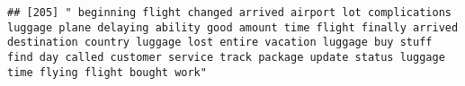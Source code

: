 \documentclass[
]{article}
\begin{document}
\begin{verbatim}
## [205] " beginning flight changed arrived airport lot complications luggage plane delaying ability good amount time flight finally arrived destination country luggage lost entire vacation luggage buy stuff find day called customer service track package update status luggage time flying flight bought work"                                                                                                                                                                                                                                                                                                                                                                                                                                                                                                                                                                                                                                                                                                                                                                                                                                                                                                                                                                                                                                                                                                                                                                                                                                                                                                                                                                                                                                                                                     

\end{verbatim}
\end{document}
